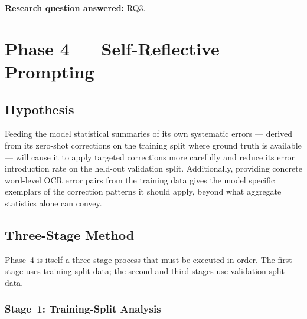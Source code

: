 \noindent
\textbf{Research question answered:} RQ3.

\section{Phase 4 --- Self-Reflective Prompting}
\label{sec:phase4}

\subsection{Hypothesis}
Feeding the model statistical summaries of its own systematic errors ---
derived from its zero-shot corrections on the training split where ground
truth is available --- will cause it to apply targeted corrections more
carefully and reduce its error introduction rate on the held-out validation
split. Additionally, providing concrete word-level OCR error pairs from the
training data gives the model specific exemplars of the correction patterns
it should apply, beyond what aggregate statistics alone can convey.

\subsection{Three-Stage Method}
\label{subsec:phase4_method}

Phase~4 is itself a three-stage process that must be executed in order.
The first stage uses training-split data; the second and third stages use
validation-split data.

\subsubsection{Stage~1: Training-Split Analysis}

